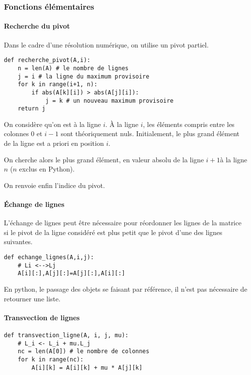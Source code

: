 \subsubsection{Fonctions élémentaires}
\paragraph*{Recherche du pivot}
Dans le cadre d'une résolution numérique, on utilise un pivot partiel. 

\begin{lstlisting}
def recherche_pivot(A,i):
    n = len(A) # le nombre de lignes
    j = i # la ligne du maximum provisoire
    for k in range(i+1, n):
        if abs(A[k][i]) > abs(A[j][i]):
            j = k # un nouveau maximum provisoire
    return j
\end{lstlisting}


On considère qu'on est à la ligne $i$. \`A la ligne $i$, les éléments compris entre les colonnes 0 et $i-1$ sont théoriquement nuls. Initialement, le plus grand élément de la ligne est a priori en position $i$. 

On cherche alors le plus grand élément, en valeur absolu de la ligne $i+1$à la ligne $n$ ($n$ exclus en Python). 

On renvoie enfin l'indice du pivot. 

\paragraph*{Échange de lignes}

L'échange de lignes peut être nécessaire pour réordonner les lignes de la matrice si le pivot de la ligne considéré est plus petit que le pivot d'une des lignes suivantes.  

\begin{lstlisting}
def echange_lignes(A,i,j):
    # Li <-->Lj
    A[i][:],A[j][:]=A[j][:],A[i][:]
\end{lstlisting}

\begin{rem}
En python, le passage des objets se faisant par référence, il n'est pas nécessaire de retourner une liste. 
\end{rem}

\paragraph*{Transvection de lignes}

\begin{lstlisting}
def transvection_ligne(A, i, j, mu):
    # L_i <- L_i + mu.L_j 
    nc = len(A[0]) # le nombre de colonnes
    for k in range(nc):
        A[i][k] = A[i][k] + mu * A[j][k]
\end{lstlisting}

